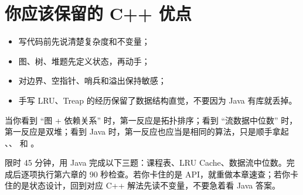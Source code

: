 \section{你应该保留的 C++ 优点}

\begin{itemize}
  \item 写代码前先说清楚复杂度和不变量；
  \item 图、树、堆题先定义状态，再动手；
  \item 对边界、空指针、哨兵和溢出保持敏感；
  \item 手写 LRU、Treap 的经历保留了数据结构直觉，不要因为 Java 有库就丢掉。
\end{itemize}

\begin{transfer}[毕业标准]
当你看到 ``图 + 依赖关系'' 时，第一反应是拓扑排序；看到 ``流数据中位数'' 时，第一反应是双堆；看到 Java 时，第一反应也应当是相同的算法，只是顺手拿起 、、 和 。
\end{transfer}

\begin{drill}[最终模拟]
限时 45 分钟，用 Java 完成以下三题：课程表、LRU Cache、数据流中位数。完成后逐项执行第六章的 90 秒检查。若你卡住的是 API，就重做本章速查；若你卡住的是状态设计，回到对应 C++ 解法先读不变量，不要急着看 Java 答案。
\end{drill}
